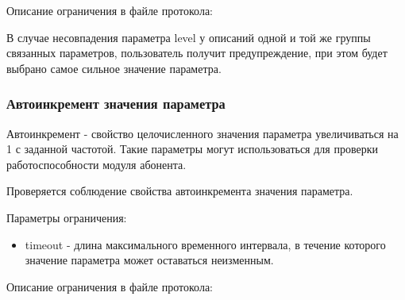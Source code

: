 Описание ограничения в файле протокола:



В случае несовпадения параметра level у описаний одной и той же 
группы связанных параметров, пользователь получит предупреждение, при этом 
будет выбрано самое сильное значение параметра.

\subsubsection{Автоинкремент значения параметра}

Автоинкремент - свойство целочисленного значения параметра 
увеличиваться на 1 с заданной частотой. Такие параметры могут 
использоваться для проверки работоспособности модуля абонента.

Проверяется соблюдение свойства автоинкремента значения параметра.

Параметры ограничения:
\begin{itemize}
 \item timeout - длина максимального временного интервала, в течение которого 
значение параметра может оставаться неизменным.
\end{itemize}

Описание ограничения в файле протокола:


